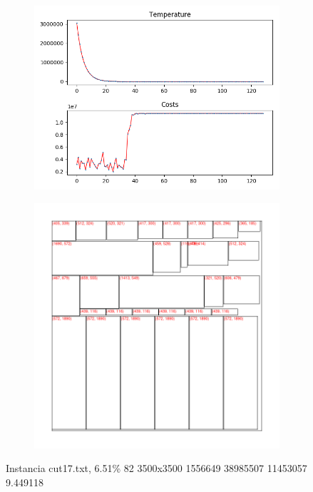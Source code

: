 \begin{figure}
\centering
\begin{subfigure}{.5\textwidth}
  \centering
  \includegraphics[width=1\linewidth]{results/cut17/1/plot}
  \label{fig:sub1}
\end{subfigure}%
\begin{subfigure}{.5\textwidth}
  \centering
  \includegraphics[width=1\linewidth]{results/cut17/1/cut}
  \label{fig:sub2}
\end{subfigure}
\caption{Instancia cut17.txt, 6.51\% 82 3500x3500 1556649 38985507 11453057 9.449118}
\label{fig:test}
\end{figure}


